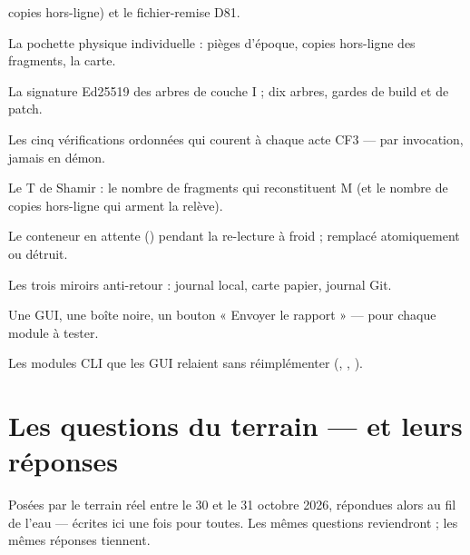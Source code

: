 \begin{description}[style=nextline, leftmargin=1.2em]
copies hors-ligne) et le fichier-remise D81.
\item[sachet] La pochette physique individuelle : pièges d'époque, copies hors-ligne
des fragments, la carte.
\item[sceau de l'Intention] La signature Ed25519 des arbres de couche I ; dix arbres,
gardes de build et de patch.
\item[sentinelle instantanée] Les cinq vérifications ordonnées qui courent à chaque
acte CF3 — par invocation, jamais en démon.
\item[seuil] Le T de Shamir : le nombre de fragments qui reconstituent M (et le nombre
de copies hors-ligne qui arment la relève).
\item[staging] Le conteneur en attente () pendant la
re-lecture à froid ; remplacé atomiquement ou détruit.
\item[témoins d'époque] Les trois miroirs anti-retour : journal local, carte papier,
journal Git.
\item[trio D122] Une GUI, une boîte noire, un bouton « Envoyer le rapport » — pour
chaque module à tester.
\item[vérités vivantes] Les modules CLI que les GUI relaient sans réimplémenter
(, , ).
\end{description}

\section{Les questions du terrain — et leurs réponses}\label{sec:faq}

Posées par le terrain réel entre le 30 et le 31 octobre 2026, répondues alors au fil
de l'eau — écrites ici une fois pour toutes. Les mêmes questions reviendront ; les
mêmes réponses tiennent.

